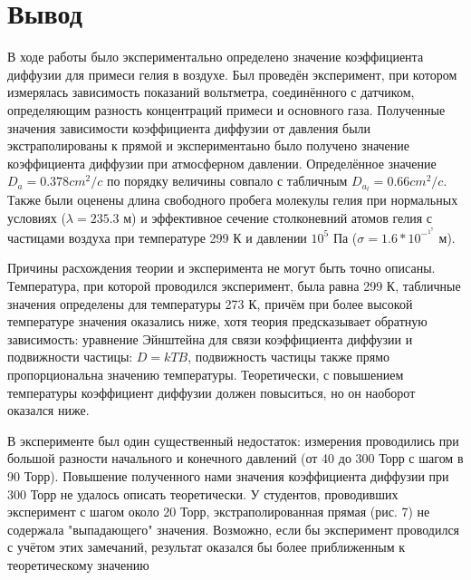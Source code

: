 \documentclass{article}
\begin{document}
\section{Вывод}
В ходе работы было экспериментально определено значение коэффициента диффузии для примеси гелия в воздухе. Был проведён эксперимент, при котором измерялась зависимость показаний вольтметра, соединённого с датчиком, определяющим разность концентраций примеси и основного газа. Полученные значения зависимости коэффициента диффузии от давления были экстраполированы к прямой и экспериментаьно было получено значение коэффициента диффузии при атмосферном давлении. Определённое значение $D_a = 0.378 cm^2/c$  по порядку величины совпало с табличным $D_a_t = 0.66 cm^2/c$. Также были оценены длина свободного пробега молекулы гелия при нормальных условиях ($\lambda =  235.3$ м) и эффективное сечение столконевний атомов гелия с частицами воздуха при температуре 299 К и давлении $10^5$ Па ($\sigma = 1.6 * 10^-^1^7$ м).\par
Причины расхождения теории и эксперимента не могут быть точно описаны. Температура, при которой проводился эксперимент, была равна 299 К, табличные значения определены для температуры 273 К, причём при более высокой температуре значения оказались ниже, хотя теория предсказывает обратную зависимость: уравнение Эйнштейна для связи коэффициента диффузии и подвижности частицы: $D = kTB$, подвижность частицы также прямо пропорциональна значению температуры. Теоретически, с повышением температуры коэффициент диффузии должен повыситься, но он наоборот оказался ниже. \par
В эксперименте был один существенный недостаток: измерения проводились при большой разности начального и конечного давлений (от 40 до 300 Торр с шагом в 90 Торр). Повышение полученного нами значения коэффициента диффузии при 300 Торр не удалось описать теоретически. У студентов, проводивших эксперимент с шагом около 20 Торр, экстраполированная прямая (рис. 7) не содержала "выпадающего"  значения. Возможно, если бы эксперимент проводился с учётом этих замечаний, результат оказался бы более приближенным к теоретическому значению
\end{document}
